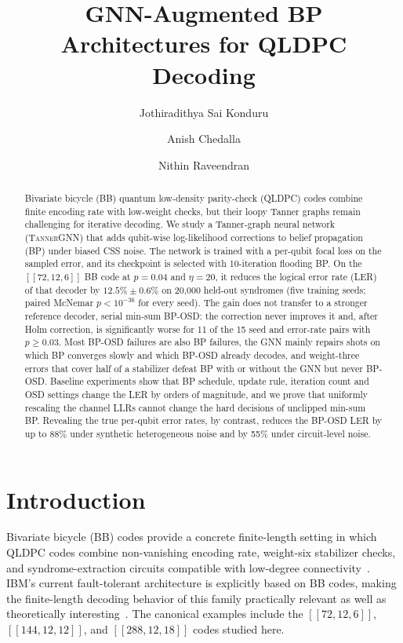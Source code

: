 \documentclass[a4paper,twocolumn,11pt,nopdfoutputerror]{quantumarticle}
\title{GNN-Augmented BP Architectures for QLDPC Decoding}
\author{Jothiradithya Sai Konduru}
\affiliation{Paradise Valley High School, Phoenix, AZ, USA}
\author{Anish Chedalla}
\affiliation{Paradise Valley High School, Phoenix, AZ, USA}
\author{Nithin Raveendran}
\affiliation{Department of Electrical and Computer Engineering,
             University of Arizona, Tucson, AZ, USA}
\newcommand{\code}[3]{\ensuremath{[\![#1,#2,#3]\!]}}
\begin{document}
\maketitle

\begin{abstract}
Bivariate bicycle (BB) quantum low-density parity-check (QLDPC) codes
combine finite encoding rate with low-weight checks, but their loopy
Tanner graphs remain challenging for iterative decoding. We study a
Tanner-graph neural network (\textsc{TannerGNN}) that adds qubit-wise
log-likelihood corrections to belief propagation (BP) under biased CSS
noise. The network is trained with a per-qubit focal loss on the sampled
error, and its checkpoint is selected with 10-iteration flooding BP. On
the $\code{72}{12}{6}$ BB code at $p=0.04$ and $\eta=20$, it reduces the
logical error rate (LER) of that decoder by $12.5\%\pm0.6\%$ on 20{,}000
held-out syndromes (five training seeds; paired McNemar $p<10^{-36}$ for
every seed). The gain does not transfer to a stronger reference decoder,
serial min-sum BP-OSD: the correction never improves it and, after Holm
correction, is significantly worse for 11 of the 15 seed and
error-rate pairs with $p\geq0.03$. Most BP-OSD failures are also BP
failures, the GNN mainly repairs shots on which BP converges slowly and
which BP-OSD already decodes, and weight-three errors that cover half of a
stabilizer defeat BP with or without the GNN but never BP-OSD. Baseline
experiments show that BP schedule, update rule, iteration count and OSD
settings change the LER by orders of magnitude, and we prove that
uniformly rescaling the channel LLRs cannot change the hard decisions of
unclipped min-sum BP. Revealing the true per-qubit error rates, by
contrast, reduces the BP-OSD LER by up to 88\% under synthetic
heterogeneous noise and by 55\% under circuit-level noise.
\end{abstract}

\section{Introduction}

Bivariate bicycle (BB) codes provide a concrete finite-length setting in
which QLDPC codes combine non-vanishing encoding rate, weight-six
stabilizer checks, and syndrome-extraction circuits compatible with
low-degree connectivity~\cite{Bravyi2024Memory}. IBM's current
fault-tolerant architecture is explicitly based on BB codes, making the
finite-length decoding behavior of this family practically relevant as
well as theoretically interesting~\cite{IBMRoadmap2025,Yoder2025TourDeGross}. The canonical
examples include the $\code{72}{12}{6}$, $\code{144}{12}{12}$, and
$\code{288}{12}{18}$ codes studied here.
\end{document}
